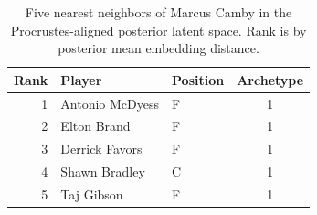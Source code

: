 \begin{table}[htbp]
  \centering\small
  \begin{tabular}{rllc}
    \toprule
    Rank & Player & Position & Archetype \\
    \midrule
    1 & Antonio McDyess & F & 1 \\
    2 & Elton Brand & F & 1 \\
    3 & Derrick Favors & F & 1 \\
    4 & Shawn Bradley & C & 1 \\
    5 & Taj Gibson & F & 1 \\
    \bottomrule
  \end{tabular}
  \caption{Five nearest neighbors of Marcus Camby in the Procrustes-aligned posterior latent space. Rank is by posterior mean embedding distance.}
  \label{tab:Marcus_Camby_neighbors}
\end{table}

